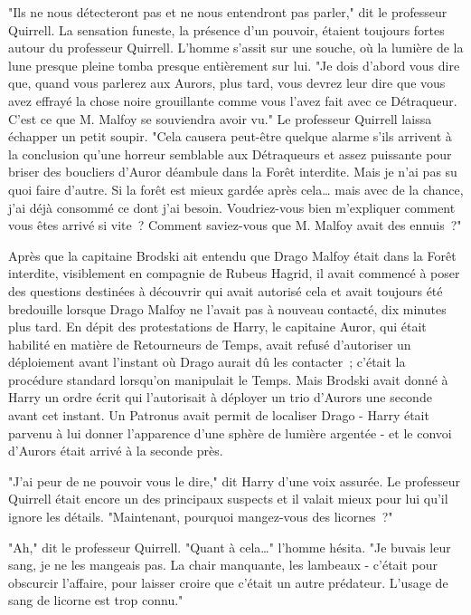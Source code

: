 "Ils ne nous détecteront pas et ne nous entendront pas parler," dit le professeur Quirrell. La sensation funeste, la présence d'un pouvoir, étaient toujours fortes autour du professeur Quirrell. L'homme s'assit sur une souche, où la lumière de la lune presque pleine tomba presque entièrement sur lui. "Je dois d'abord vous dire que, quand vous parlerez aux Aurors, plus tard, vous devrez leur dire que vous avez effrayé la chose noire grouillante comme vous l'avez fait avec ce Détraqueur. C'est ce que M. Malfoy se souviendra avoir vu." Le professeur Quirrell laissa échapper un petit soupir. "Cela causera peut-être quelque alarme s'ils arrivent à la conclusion qu'une horreur semblable aux Détraqueurs et assez puissante pour briser des boucliers d'Auror déambule dans la Forêt interdite. Mais je n'ai pas su quoi faire d'autre. Si la forêt est mieux gardée après cela… mais avec de la chance, j'ai déjà consommé ce dont j'ai besoin. Voudriez-vous bien m'expliquer comment vous êtes arrivé si vite~? Comment saviez-vous que M. Malfoy avait des ennuis~?"

Après que la capitaine Brodski ait entendu que Drago Malfoy était dans la Forêt interdite, visiblement en compagnie de Rubeus Hagrid, il avait commencé à poser des questions destinées à découvrir qui avait autorisé cela et avait toujours été bredouille lorsque Drago Malfoy ne l'avait pas à nouveau contacté, dix minutes plus tard. En dépit des protestations de Harry, le capitaine Auror, qui était habilité en matière de Retourneurs de Temps, avait refusé d'autoriser un déploiement avant l'instant où Drago aurait dû les contacter~; c'était la procédure standard lorsqu'on manipulait le Temps. Mais Brodski avait donné à Harry un ordre écrit qui l'autorisait à déployer un trio d'Aurors une seconde avant cet instant. Un Patronus avait permit de localiser Drago - Harry était parvenu à lui donner l'apparence d'une sphère de lumière argentée - et le convoi d'Aurors était arrivé à la seconde près.

"J'ai peur de ne pouvoir vous le dire," dit Harry d'une voix assurée. Le professeur Quirrell était encore un des principaux suspects et il valait mieux pour lui qu'il ignore les détails. "Maintenant, pourquoi mangez-vous des licornes~?"

"Ah," dit le professeur Quirrell. "Quant à cela…" l'homme hésita. "Je buvais leur sang, je ne les mangeais pas. La chair manquante, les lambeaux - c'était pour obscurcir l'affaire, pour laisser croire que c'était un autre prédateur. L'usage de sang de licorne est trop connu."

